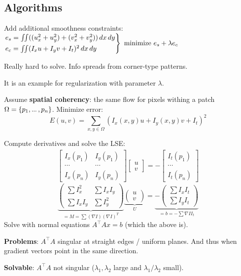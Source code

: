 \subsection{Algorithms}

\begin{algorithm}
  Add additional smoothness constraints:
  \(\begin{rcases*}
    e_s = \iint ((u_x^2 + u_y^2) + (v_x^2 + v_y^2)) \,dx \,dy \\
    e_c = \iint (I_x u + I_yv +I_t)^2 \,dx \,dy
  \end{rcases*} \ \text{minimize} \ e_s + \lambda e_c \)

  Really hard to solve. Info spreads from corner-type patterns.

  It is an example for regularization with parameter \(\lambda\).
\end{algorithm}

\begin{algorithm}
  Assume \textbf{spatial coherency}: the same flow for pixels withing a patch \(\Omega = \{p_1, \sdots , p_n\}\). Minimize error:
  \[E(u, v) = \sum_{x, y \in \Omega} (I_x(x, y) u + I_y(x, y) v + I_t)^2\]
  
  Compute derivatives and solve the LSE:
  \begin{gather*}
    \left[\begin{smallmatrix}
    I_x(p_1) & I_y(p_1) \\ \cdots & \cdots \\ I_x(p_n) & I_y(p_n)
  \end{smallmatrix}\right] \left[\begin{smallmatrix}
    u \\ v
  \end{smallmatrix}\right] =  - \left[\begin{smallmatrix}
    I_t(p_1) \\ \cdots \\ I_t(p_n)
  \end{smallmatrix}\right]
  \end{gather*}
\[
\underbrace{
\left(\begin{array}{cc}
\sum I_x^2 & \sum I_x I_y \\
\sum I_x I_y & \sum I_y^2
\end{array}\right)}_{=M= \sum (\nabla I)(\nabla I)^T}
\underbrace{\left(\begin{array}{l}
u \\
v
\end{array}\right)}_{U}=
\underbrace{-\left(\begin{array}{l}
\sum I_x I_t \\
\sum I_y I_t
\end{array}\right)}_{=b=-\sum \nabla I I_t}
\]
  Solve with normal equations \(A^\top A x = b\) (which the above is).

  \textbf{Problems}: \(A^\top A\) singular at straight edges / uniform planes. And thus when gradient vectors point in the same direction.

  \textbf{Solvable}: \(A^\top A\) not singular (\(\lambda_1, \lambda_2\) large and \(\lambda_1 / \lambda_2\) small).
\end{algorithm}

